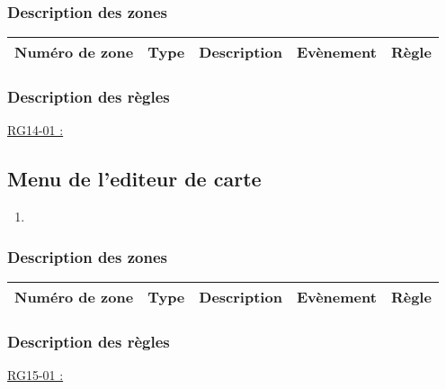 \documentclass{report}
\begin{document}
		\subsubsection{Description des zones}
		
			\begin{tabular}{|c|c|c|c|c|} \hline
				Numéro de zone & Type  & Description & Evènement &	Règle \\\hline
			\end{tabular}
			
		\subsubsection{Description des règles}

			\underline{RG14-01 :}
				\begin{quote}

				\end{quote}
				
				
				
\newpage

	\subsection{Menu de l'editeur de carte}
		
		\hypertarget{Menu_pause_creation_carte}{}
		\label{Menu_pause_creation_carte}
			
		\begin{center}
			
		\end{center}
		
		\begin{enumerate}
		  \item 
		\end{enumerate}

		\subsubsection{Description des zones}
		
			\begin{tabular}{|c|c|c|c|c|} \hline
				Numéro de zone & Type  & Description & Evènement &	Règle \\\hline
			\end{tabular}
			
		\subsubsection{Description des règles}

			\underline{RG15-01 :}
				\begin{quote}

				\end{quote}
				
\end{document}
